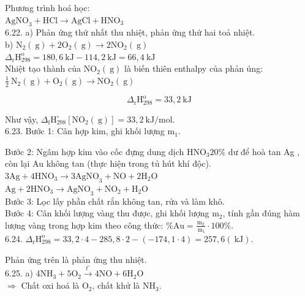\documentclass[10pt]{article}
\begin{document}
Phương trình hoá học:\\
$\mathrm{AgNO}_{3}+\mathrm{HCl} \longrightarrow \mathrm{AgCl}+\mathrm{HNO}_{3}$\\
6.22. a) Phản ứng thứ nhất thu nhiệt, phản ứng thứ hai toả nhiệt.\\
b) $\mathrm{N}_{2}(\mathrm{~g})+2 \mathrm{O}_{2}(\mathrm{~g}) \longrightarrow 2 \mathrm{NO}_{2}(\mathrm{~g})$\\
$\Delta_{\mathrm{r}} \mathrm{H}_{298}^{\mathrm{o}}=180,6 \mathrm{~kJ}-114,2 \mathrm{~kJ}=66,4 \mathrm{~kJ}$\\
Nhiệt tạo thành của $\mathrm{NO}_{2}(\mathrm{~g})$ là biến thiên enthalpy của phản úng:\\
$\frac{1}{2} \mathrm{~N}_{2}(\mathrm{~g})+\mathrm{O}_{2}(\mathrm{~g}) \longrightarrow \mathrm{NO}_{2}(\mathrm{~g})$

$$
\Delta_{\mathrm{r}} \mathrm{H}_{298}^{\mathrm{o}}=33,2 \mathrm{~kJ}
$$

Như vậy, $\Delta_{\mathrm{f}} \mathrm{H}_{298}^{\circ}\left[\mathrm{NO}_{2}(\mathrm{~g})\right]=33,2 \mathrm{~kJ} / \mathrm{mol}$.\\
6.23. Bước 1: Cân hợp kim, ghi khối lượng $\mathrm{m}_{1}$.

Bước 2: Ngâm hợp kim vào cốc đựng dung dịch $\mathrm{HNO}_{3} 20 \%$ dư để hoà tan Ag , còn lại Au không tan (thực hiện trong tủ hút khí độc).\\
$3 \mathrm{Ag}+4 \mathrm{HNO}_{3} \longrightarrow 3 \mathrm{AgNO}_{3}+\mathrm{NO}+2 \mathrm{H}_{2} \mathrm{O}$\\
$\mathrm{Ag}+2 \mathrm{HNO}_{3} \longrightarrow \mathrm{AgNO}_{3}+\mathrm{NO}_{2}+\mathrm{H}_{2} \mathrm{O}$\\
Bước 3: Lọc lấy phần chất rắn không tan, rửa và làm khô.\\
Bước 4: Cân khối lượng vàng thu được, ghi khối lượng $\mathrm{m}_{2}$, tính gần đúng hàm lượng vàng trong hợp kim theo công thức: $\% \mathrm{Au}=\frac{\mathrm{m}_{2}}{\mathrm{~m}_{1}} \cdot 100 \%$.\\
6.24. $\Delta_{\mathrm{r}} \mathrm{H}_{298}^{\mathrm{o}}=33,2 \cdot 4-285,8 \cdot 2-(-174,1 \cdot 4)=257,6(\mathrm{~kJ})$.

Phản ứng trên là phản ứng thu nhiệt.\\
6.25. a) $4 \mathrm{NH}_{3}+5 \mathrm{O}_{2} \xrightarrow{t^{\circ}} 4 \mathrm{NO}+6 \mathrm{H}_{2} \mathrm{O}$\\
$\Rightarrow$ Chất oxi hoá là $\mathrm{O}_{2}$, chất khử là $\mathrm{NH}_{3}$.
\end{document}
